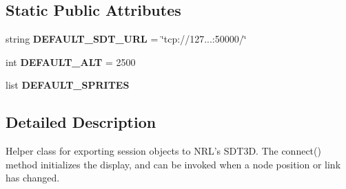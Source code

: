 \subsection*{Static Public Attributes}
\begin{DoxyCompactItemize}
\item 
\hypertarget{classcore_1_1sdt_1_1_sdt_a403dab244bf51c9936eeaef7bbe84297}{string {\bfseries D\+E\+F\+A\+U\+L\+T\+\_\+\+S\+D\+T\+\_\+\+U\+R\+L} = \char`\"{}tcp\+://127...\+:50000/\char`\"{}}\label{classcore_1_1sdt_1_1_sdt_a403dab244bf51c9936eeaef7bbe84297}

\item 
\hypertarget{classcore_1_1sdt_1_1_sdt_a515abaf63f0d9e937c18174201171a41}{int {\bfseries D\+E\+F\+A\+U\+L\+T\+\_\+\+A\+L\+T} = 2500}\label{classcore_1_1sdt_1_1_sdt_a515abaf63f0d9e937c18174201171a41}

\item 
list {\bfseries D\+E\+F\+A\+U\+L\+T\+\_\+\+S\+P\+R\+I\+T\+E\+S}
\end{DoxyCompactItemize}


\subsection{Detailed Description}
\begin{DoxyVerb}Helper class for exporting session objects to NRL's SDT3D.
The connect() method initializes the display, and can be invoked
when a node position or link has changed.
\end{DoxyVerb}
 

